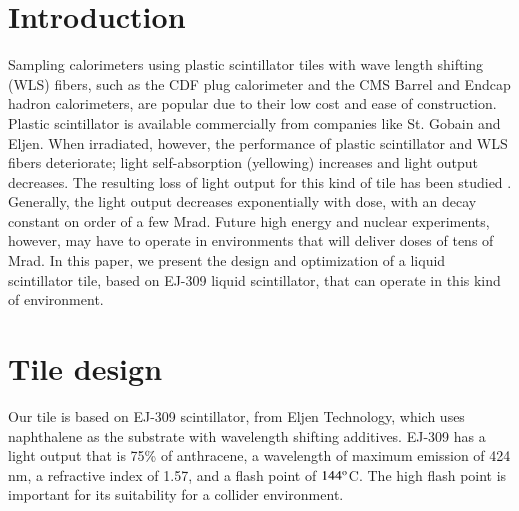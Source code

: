 \documentclass[review]{elsarticle}
\begin{document}
\linenumbers

\section{Introduction}
Sampling calorimeters using plastic scintillator tiles with wave
length shifting (WLS) fibers, such as the CDF plug calorimeter
\cite{Aota1995557} and the CMS Barrel\cite{CMSHB} and
Endcap\cite{HCALTDR1997} hadron calorimeters, are popular due to their
low cost and ease of construction.  Plastic scintillator is available
commercially from companies like St. Gobain and Eljen.  When
irradiated, however, the performance of plastic scintillator and WLS
fibers deteriorate; light self-absorption (yellowing) increases and
light output decreases.  The resulting loss of light output for this
kind of tile has been studied \cite{vasken}\cite{ByonWagner1993263}.
Generally, the light output decreases exponentially with dose, with an
decay constant on order of a few Mrad.  Future high energy and nuclear
experiments, however, may have to operate in environments that will
deliver doses of tens of Mrad.  In this paper, we present the design
and optimization of a liquid scintillator tile, based on EJ-309 liquid
scintillator, that can operate in this kind of environment.


\section{Tile design}

Our tile is based on EJ-309 scintillator, from Eljen Technology, which
uses naphthalene as the substrate with wavelength shifting additives.
EJ-309 has a light output that is 75\% of anthracene, a wavelength of
maximum emission of 424 nm, a refractive index of 1.57, and a flash
point of $\rm{144^o}$C.  The high flash point is important for its
suitability for a collider environment.
\end{document}
